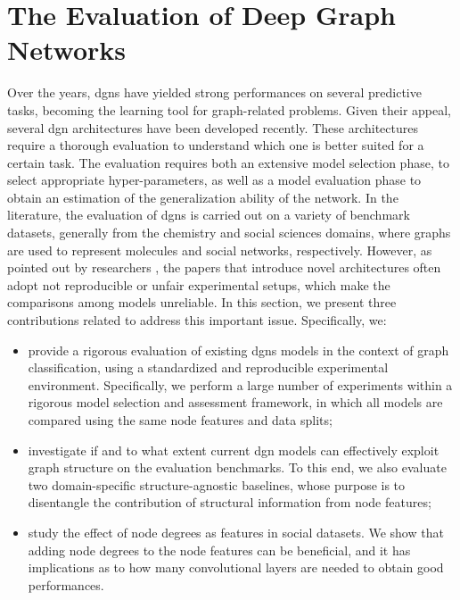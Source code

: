 \section{The Evaluation of Deep Graph Networks}
Over the years, \glspl{dgn} have yielded strong performances on several predictive tasks, becoming the  learning tool for graph-related problems. Given their appeal, several \gls{dgn} architectures have been developed recently. These architectures require a thorough evaluation to understand which one is better suited for a certain task. The evaluation requires both an extensive model selection phase, to select appropriate hyper-parameters, as well as a model evaluation phase to obtain an estimation of the generalization ability of the network. In the literature, the evaluation of \glspl{dgn} is carried out on a variety of benchmark datasets, generally from the chemistry and social sciences domains, where graphs are used to represent molecules and social networks, respectively. However, as pointed out by researchers \citep{lipton2018troubling}, the papers that introduce novel architectures often adopt not reproducible or unfair experimental setups, which make the comparisons among models unreliable. In this section, we present three contributions related to address this important issue. Specifically, we:
\begin{itemize}
    \item provide a rigorous evaluation of existing \glspl{dgn} models in the context of graph classification, using a standardized and reproducible experimental environment. Specifically, we perform a large number of experiments within a rigorous model selection and assessment framework, in which all models are compared using the same node features and data splits;
    \item investigate if and to what extent current \gls{dgn} models can effectively exploit graph structure on the evaluation benchmarks. To this end, we also evaluate two domain-specific structure-agnostic baselines, whose purpose is to disentangle the contribution of structural information from node features;
    \item study the effect of node degrees as features in social datasets. We show that adding node degrees to the node features can be beneficial, and it has implications as to how many convolutional layers are needed to obtain good performances.
\end{itemize}

